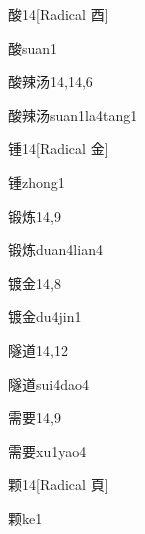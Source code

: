 \begin{entry}{酸}{14}[Radical 酉]
  \begin{phonetics}{酸}{suan1}
  \end{phonetics}
\end{entry}

\begin{entry}{酸辣汤}{14,14,6}
  \begin{phonetics}{酸辣汤}{suan1la4tang1}
  \end{phonetics}
\end{entry}

\begin{entry}{锺}{14}[Radical 金]
  \begin{phonetics}{锺}{zhong1}
  \end{phonetics}
\end{entry}

\begin{entry}{锻炼}{14,9}
  \begin{phonetics}{锻炼}{duan4lian4}
  \end{phonetics}
\end{entry}

\begin{entry}{镀金}{14,8}
  \begin{phonetics}{镀金}{du4jin1}
  \end{phonetics}
\end{entry}

\begin{entry}{隧道}{14,12}
  \begin{phonetics}{隧道}{sui4dao4}
  \end{phonetics}
\end{entry}

\begin{entry}{需要}{14,9}
  \begin{phonetics}{需要}{xu1yao4}
  \end{phonetics}
\end{entry}

\begin{entry}{颗}{14}[Radical 頁]
  \begin{phonetics}{颗}{ke1}
  \end{phonetics}
\end{entry}

